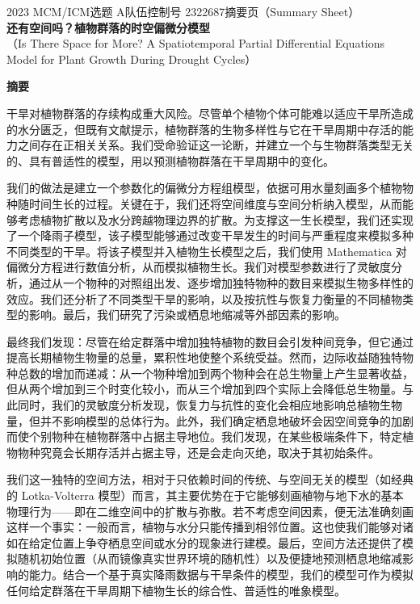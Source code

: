 \documentclass[11pt,a4paper]{ctexart}
\begin{document}
\thispagestyle{empty}
\begin{center}
{\small 2023 MCM/ICM\quad 选题 A\quad 队伍控制号 2322687\quad 摘要页（Summary Sheet）}\\[18pt]
{\LARGE\bfseries 还有空间吗？植物群落的时空偏微分模型}\\[8pt]
{\large （Is There Space for More? A Spatiotemporal Partial Differential Equations Model for Plant Growth During Drought Cycles）}\\[10pt]
\end{center}

\begin{center}
{\large\bfseries 摘\quad 要}
\end{center}

\vspace{6pt}
干旱对植物群落的存续构成重大风险。尽管单个植物个体可能难以适应干旱所造成的水分匮乏，但既有文献提示，植物群落的生物多样性与它在干旱周期中存活的能力之间存在正相关关系。我们受命验证这一论断，并建立一个与生物群落类型无关的、具有普适性的模型，用以预测植物群落在干旱周期中的变化。

我们的做法是建立一个参数化的偏微分方程组模型，依据可用水量刻画多个植物物种随时间生长的过程。关键在于，我们还将空间维度与空间分析纳入模型，从而能够考虑植物扩散以及水分跨越物理边界的扩散。为支撑这一生长模型，我们还实现了一个降雨子模型，该子模型能够通过改变干旱发生的时间与严重程度来模拟多种不同类型的干旱。将该子模型并入植物生长模型之后，我们使用 Mathematica 对偏微分方程进行数值分析，从而模拟植物生长。我们对模型参数进行了灵敏度分析，通过从一个物种的对照组出发、逐步增加独特物种的数目来模拟生物多样性的效应。我们还分析了不同类型干旱的影响，以及按抗性与恢复力衡量的不同植物类型的影响。最后，我们研究了污染或栖息地缩减等外部因素的影响。

最终我们发现：尽管在给定群落中增加独特植物的数目会引发种间竞争，但它通过提高长期植物生物量的总量，累积性地使整个系统受益。然而，边际收益随独特物种总数的增加而递减：从一个物种增加到两个物种会在总生物量上产生显著收益，但从两个增加到三个时变化较小，而从三个增加到四个实际上会降低总生物量。与此同时，我们的灵敏度分析发现，恢复力与抗性的变化会相应地影响总植物生物量，但并不影响模型的总体行为。此外，我们确定栖息地破坏会因空间竞争的加剧而使个别物种在植物群落中占据主导地位。我们发现，在某些极端条件下，特定植物物种究竟会长期存活并占据主导，还是会走向灭绝，取决于其初始条件。

我们这一独特的空间方法，相对于只依赖时间的传统、与空间无关的模型（如经典的 Lotka-Volterra 模型）而言，其主要优势在于它能够刻画植物与地下水的基本物理行为——即在二维空间中的扩散与弥散。若不考虑空间因素，便无法准确刻画这样一个事实：一般而言，植物与水分只能传播到相邻位置。这也使我们能够对诸如在给定位置上争夺栖息空间或水分的现象进行建模。最后，空间方法还提供了模拟随机初始位置（从而镜像真实世界环境的随机性）以及便捷地预测栖息地缩减影响的能力。结合一个基于真实降雨数据与干旱条件的模型，我们的模型可作为模拟任何给定群落在干旱周期下植物生长的综合性、普适性的唯象模型。
\end{document}
